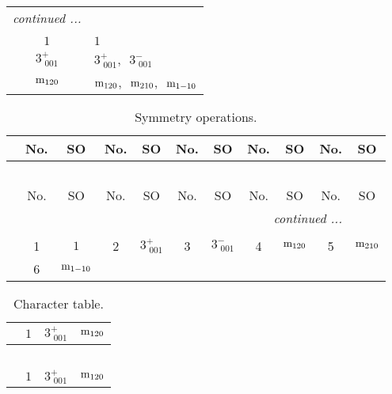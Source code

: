 \documentclass[fleqn,10pt,landscape]{article}
\begin{document}
\begin{itemize}
\begin{center}
\begin{longtable}{c|l}
 \hline \hline
\multicolumn{1}{r}{\footnotesize\it continued ...} \\ \endfoot

 \hline \hline
\multicolumn{1}{r}{} \\ \endlastfoot

$1$ & $1$ \\ \hline
$3^{+}_{\,\,001}$ & $3^{+}_{\,\,001}$,\,\, $3^{-}_{\,\,001}$ \\ \hline
${\rm m}_{120}$ & ${\rm m}_{120}$,\,\, ${\rm m}_{210}$,\,\, ${\rm m}_{1-10}$ \\
\end{longtable}
\end{center}
\begin{center}
\renewcommand{\arraystretch}{1.3}
\begin{longtable}{c|cc|cc|cc|cc|cc}
\caption{Symmetry operations.}
 \\
 \hline \hline
 & No. & SO & No. & SO & No. & SO & No. & SO & No. & SO \\ \hline \endfirsthead

\multicolumn{10}{l}{\tablename\ \thetable{}} \\
 \hline \hline
 & No. & SO & No. & SO & No. & SO & No. & SO & No. & SO \\ \hline \endhead

 \hline \hline
\multicolumn{10}{r}{\footnotesize\it continued ...} \\ \endfoot

 \hline \hline
\multicolumn{10}{r}{} \\ \endlastfoot

 & 1 & $1$ & 2 & $3^{+}_{\,\,001}$ & 3 & $3^{-}_{\,\,001}$ & 4 & ${\rm m}_{120}$ & 5 & ${\rm m}_{210}$ \\
& 6 & ${\rm m}_{1-10}$ &  &  &  &  &  &  &  &  \\
\end{longtable}
\end{center}
\begin{center}
\renewcommand{\arraystretch}{1.0}
\begin{longtable}{c|rrr}
\caption{Character table.}
 \\
 \hline \hline
 & $ 1 $ & $ 3^{+}_{\,\,001} $ & $ {\rm m}_{120} $ \\ \hline \endfirsthead

\multicolumn{3}{l}{\tablename\ \thetable{}} \\
 \hline \hline
 & $ 1 $ & $ 3^{+}_{\,\,001} $ & $ {\rm m}_{120} $ \\ \hline \endhead


\end{longtable}
\end{center}
\end{itemize}
\end{document}
